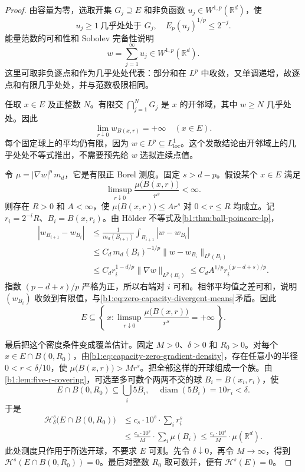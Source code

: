 \begin{proof}
由容量为零，选取开集 \(G_j\supseteq E\) 和非负函数
\(u_j\in W^{1,p}(\mathbb R^d)\)，使
\[
 u_j\geq1\ \text{几乎处处于 }G_j,\quad
 E_p(u_j)^{1/p}\leq2^{-j}.
\]
能量范数的可和性和 Sobolev 完备性说明
\[
 w=\sum_{j=1}^{\infty}u_j\in W^{1,p}(\mathbb R^d).
\]
这里可取非负逐点和作为几乎处处代表：部分和在 \(L^p\) 中收敛，又单调递增，故逐点和有限几乎处处，并与范数极限相同。

任取 \(x\in E\) 及正整数 \(N\)。有限交
\(\bigcap_{j=1}^NG_j\) 是 \(x\) 的开邻域，其中 \(w\geq N\) 几乎处处。因此
\begin{equation}\label{b1:eq:zero-capacity-divergent-means}
 \lim_{r\downarrow0}w_{B(x,r)}=+\infty
 \quad(x\in E).
\end{equation}
每个固定球上的平均仍有限，因为 \(w\in L^p\subseteq L^1_{\mathrm{loc}}\)。这个发散结论由开邻域上的几乎处处不等式推出，不需要预先给 \(w\) 选拟连续点值。

令 \(\mu=|\nabla w|^p\,m_d\)，它是有限正 Borel 测度。固定 \(s>d-p\)。假设某个 \(x\in E\) 满足
\[
 \limsup_{r\downarrow0}\frac{\mu\bigl(B(x,r)\bigr)}{r^s}<\infty.
\]
则存在 \(R>0\) 和 \(A<\infty\)，使
\(\mu\bigl(B(x,r)\bigr)\leq Ar^s\) 对 \(0<r\leq R\) 均成立。记
\(r_i=2^{-i}R\)、\(B_i=B(x,r_i)\)。由 Hölder 不等式及\cref{b1:thm:ball-poincare-lp}，
\[
 \begin{aligned}
 |w_{B_{i+1}}-w_{B_i}|
 &\leq\frac1{m_d(B_{i+1})}\int_{B_{i+1}}|w-w_{B_i}|\\
 &\leq C_d\,m_d(B_i)^{-1/p}\|w-w_{B_i}\|_{L^p(B_i)}\\
 &\leq C_d r_i^{1-d/p}\|\nabla w\|_{L^p(B_i)}
 \leq C_dA^{1/p}r_i^{(p-d+s)/p}.
 \end{aligned}
\]
指数 \((p-d+s)/p\) 严格为正，所以右端对 \(i\) 可和。相邻平均值之差可和，说明 \((w_{B_i})\) 收敛到有限值，与\eqref{b1:eq:zero-capacity-divergent-means}矛盾。因此
\begin{equation}\label{b1:eq:capacity-zero-gradient-density}
 E\subseteq
 \left\{\,x:\limsup_{r\downarrow0}
               \frac{\mu\bigl(B(x,r)\bigr)}{r^s}=+\infty\,\right\}.
\end{equation}

最后把这个密度条件变成覆盖估计。固定 \(M>0\)、\(\delta>0\) 和 \(R_0>0\)。对每个 \(x\in E\cap B(0,R_0)\)，由\eqref{b1:eq:capacity-zero-gradient-density}，存在任意小的半径
\(0<r<\delta/10\)，使
\(\mu\bigl(B(x,r)\bigr)>Mr^s\)。把全部这样的开球组成一个族。由\cref{b1:lem:five-r-covering}，可选至多可数个两两不交的球 \(B_i=B(x_i,r_i)\)，使
\[
 E\cap B(0,R_0)\subseteq\bigcup_i5B_i,\quad
 \operatorname{diam}(5B_i)=10r_i<\delta.
\]
于是
\[
 \begin{aligned}
 \mathcal H^s_\delta\bigl(E\cap B(0,R_0)\bigr)
 &\leq c_s\cdot10^s\cdot\sum_i r_i^s\\
 &\leq\frac{c_s\cdot10^s}{M}\cdot\sum_i\mu(B_i)
 \leq\frac{c_s\cdot10^s}{M}\cdot\mu(\mathbb R^d).
 \end{aligned}
\]
此处测度只作用于所选开球，不要求 \(E\) 可测。先令
\(\delta\downarrow0\)，再令 \(M\to\infty\)，得到
\(\mathcal H^s(E\cap B(0,R_0))=0\)。最后对整数 \(R_0\) 取可数并，便有 \(\mathcal H^s(E)=0\)。
\end{proof}

